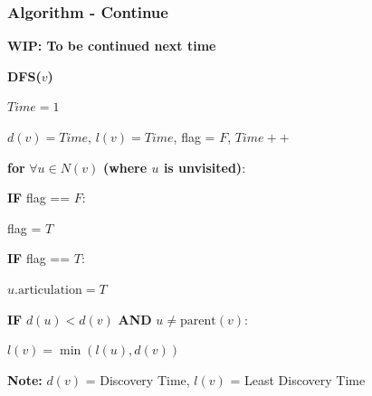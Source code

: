 \begin{frame}
    \frametitle{Algorithm - Continue}

    {\fontsize{13}{16}\selectfont \textbf{WIP: To be continued next time}} %

    \vspace{10pt} %

    \textbf{DFS(\( v \))}
    
    \vspace{5pt}
    
    \hspace{10pt} \( Time = 1 \)
    
    \vspace{5pt}
    
    \hspace{10pt} \( d(v) = Time \), \( l(v) = Time \), flag = \( F \), \( Time++ \)
    
    \vspace{5pt}
    
    \hspace{10pt} \textbf{for} \( \forall u \in N(v) \) \textbf{(where \( u \) is unvisited)}:
    
    \vspace{5pt}
    
    \hspace{15pt} \textbf{\textbf{IF}} flag == \( F \):
    
    \hspace{25pt} flag = \( T \)
    
    \vspace{5pt}
    
    \hspace{15pt} \textbf{\textbf{IF}} flag == \( T \):
    
    \hspace{25pt} \( u.\text{articulation} = T \)
    
    \vspace{5pt}
    
    \hspace{10pt} \textbf{\textbf{IF}} \( d(u) < d(v) \) \textbf{AND} \( u \neq \text{parent}(v) \):
    
    \hspace{20pt} \( l(v) = \min(l(u), d(v)) \)
    
    \vspace{10pt}
    
    \textbf{Note:} \( d(v) \) = Discovery Time, \( l(v) \) = Least Discovery Time
\end{frame}
